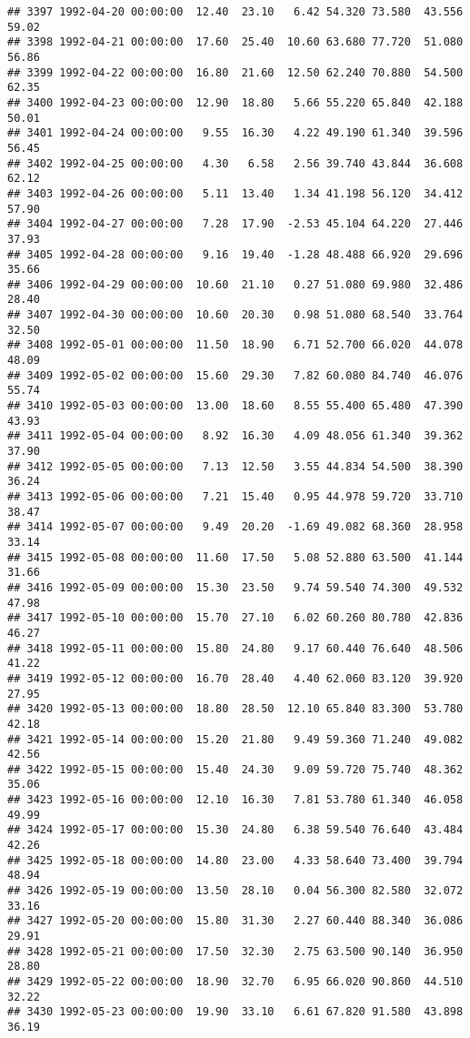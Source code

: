 \documentclass{article}\usepackage{graphicx, color}
\makeatletter
\newenvironment{kframe}{%
 \def\at@end@of@kframe{}%
 \ifinner\ifhmode%
  \def\at@end@of@kframe{\end{minipage}}%
  \begin{minipage}{\columnwidth}%
 \fi\fi%
 \def\FrameCommand##1{\hskip\@totalleftmargin \hskip-\fboxsep
 \colorbox{shadecolor}{##1}\hskip-\fboxsep
     \hskip-\linewidth \hskip-\@totalleftmargin \hskip\columnwidth}%
 \MakeFramed {\advance\hsize-\width
   \@totalleftmargin\z@ \linewidth\hsize
   \@setminipage}}%
 {\par\unskip\endMakeFramed%
 \at@end@of@kframe}
\newenvironment{knitrout}{}{} %
\makeatother
\begin{document}
\begin{knitrout}
\begin{kframe}
\begin{verbatim}
## 3397 1992-04-20 00:00:00  12.40  23.10   6.42 54.320 73.580  43.556  59.02
## 3398 1992-04-21 00:00:00  17.60  25.40  10.60 63.680 77.720  51.080  56.86
## 3399 1992-04-22 00:00:00  16.80  21.60  12.50 62.240 70.880  54.500  62.35
## 3400 1992-04-23 00:00:00  12.90  18.80   5.66 55.220 65.840  42.188  50.01
## 3401 1992-04-24 00:00:00   9.55  16.30   4.22 49.190 61.340  39.596  56.45
## 3402 1992-04-25 00:00:00   4.30   6.58   2.56 39.740 43.844  36.608  62.12
## 3403 1992-04-26 00:00:00   5.11  13.40   1.34 41.198 56.120  34.412  57.90
## 3404 1992-04-27 00:00:00   7.28  17.90  -2.53 45.104 64.220  27.446  37.93
## 3405 1992-04-28 00:00:00   9.16  19.40  -1.28 48.488 66.920  29.696  35.66
## 3406 1992-04-29 00:00:00  10.60  21.10   0.27 51.080 69.980  32.486  28.40
## 3407 1992-04-30 00:00:00  10.60  20.30   0.98 51.080 68.540  33.764  32.50
## 3408 1992-05-01 00:00:00  11.50  18.90   6.71 52.700 66.020  44.078  48.09
## 3409 1992-05-02 00:00:00  15.60  29.30   7.82 60.080 84.740  46.076  55.74
## 3410 1992-05-03 00:00:00  13.00  18.60   8.55 55.400 65.480  47.390  43.93
## 3411 1992-05-04 00:00:00   8.92  16.30   4.09 48.056 61.340  39.362  37.90
## 3412 1992-05-05 00:00:00   7.13  12.50   3.55 44.834 54.500  38.390  36.24
## 3413 1992-05-06 00:00:00   7.21  15.40   0.95 44.978 59.720  33.710  38.47
## 3414 1992-05-07 00:00:00   9.49  20.20  -1.69 49.082 68.360  28.958  33.14
## 3415 1992-05-08 00:00:00  11.60  17.50   5.08 52.880 63.500  41.144  31.66
## 3416 1992-05-09 00:00:00  15.30  23.50   9.74 59.540 74.300  49.532  47.98
## 3417 1992-05-10 00:00:00  15.70  27.10   6.02 60.260 80.780  42.836  46.27
## 3418 1992-05-11 00:00:00  15.80  24.80   9.17 60.440 76.640  48.506  41.22
## 3419 1992-05-12 00:00:00  16.70  28.40   4.40 62.060 83.120  39.920  27.95
## 3420 1992-05-13 00:00:00  18.80  28.50  12.10 65.840 83.300  53.780  42.18
## 3421 1992-05-14 00:00:00  15.20  21.80   9.49 59.360 71.240  49.082  42.56
## 3422 1992-05-15 00:00:00  15.40  24.30   9.09 59.720 75.740  48.362  35.06
## 3423 1992-05-16 00:00:00  12.10  16.30   7.81 53.780 61.340  46.058  49.99
## 3424 1992-05-17 00:00:00  15.30  24.80   6.38 59.540 76.640  43.484  42.26
## 3425 1992-05-18 00:00:00  14.80  23.00   4.33 58.640 73.400  39.794  48.94
## 3426 1992-05-19 00:00:00  13.50  28.10   0.04 56.300 82.580  32.072  33.16
## 3427 1992-05-20 00:00:00  15.80  31.30   2.27 60.440 88.340  36.086  29.91
## 3428 1992-05-21 00:00:00  17.50  32.30   2.75 63.500 90.140  36.950  28.80
## 3429 1992-05-22 00:00:00  18.90  32.70   6.95 66.020 90.860  44.510  32.22
## 3430 1992-05-23 00:00:00  19.90  33.10   6.61 67.820 91.580  43.898  36.19

\end{verbatim}
\end{kframe}
\end{knitrout}
\end{document}
